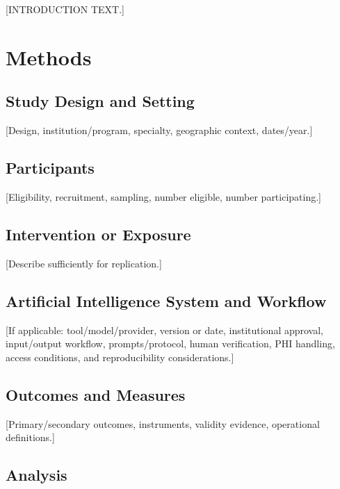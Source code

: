 \documentclass[12pt]{article}
\begin{document}

 [INTRODUCTION TEXT.]

\section{Methods}

\subsection{Study Design and Setting}

[Design, institution/program, specialty, geographic context, dates/year.]

\subsection{Participants}

[Eligibility, recruitment, sampling, number eligible, number participating.]

\subsection{Intervention or Exposure}

[Describe sufficiently for replication.]

\subsection{Artificial Intelligence System and Workflow}

[If applicable: tool/model/provider, version or date, institutional approval,
	input/output workflow, prompts/protocol, human verification, PHI handling,
	access conditions, and reproducibility considerations.]

\subsection{Outcomes and Measures}

[Primary/secondary outcomes, instruments, validity evidence, operational
	definitions.]

\subsection{Analysis}
\end{document}
